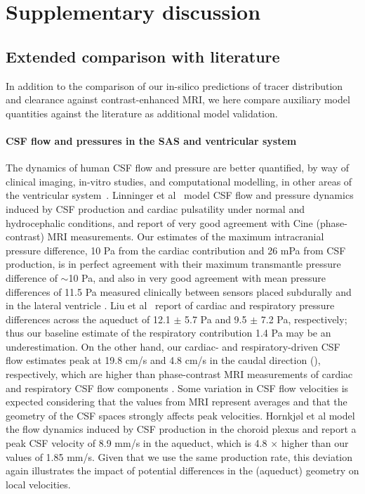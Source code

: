 \documentclass[fleqn,10pt]{wlscirep}
\begin{document}
\section{Supplementary discussion}

\subsection{Extended comparison with literature}
\label{sec:app:model_validation}

In addition to the comparison of our in-silico predictions of tracer
distribution and clearance against contrast-enhanced MRI, we here compare
auxiliary model quantities against the literature as additional model
validation.

\paragraph{CSF flow and pressures in the SAS and ventricular system}
The dynamics of human CSF flow and pressure are better quantified, by
way of clinical imaging, in-vitro studies, and computational
modelling, in other areas of the ventricular
system~\cite{linninger2007cerebrospinal, sweetman2011cerebrospinal,
  vinje2019respiratory, hornkjol2022csf, causemann2022human,
  karki2025real, liu2025transmantle}. Linninger et
al~\cite{linninger2007cerebrospinal} model CSF flow and pressure
dynamics induced by CSF production and cardiac pulsatility under
normal and hydrocephalic conditions, and report of very good agreement
with Cine (phase-contrast) MRI measurements. Our estimates of the
maximum intracranial pressure difference, 10 Pa from the cardiac
contribution and 26 mPa from CSF production, is in perfect agreement
with their maximum transmantle pressure difference of $\sim$10 Pa, and
also in very good agreement with mean pressure differences of 11.5 Pa
measured clinically between sensors placed subdurally and in the
lateral ventricle \cite{vinje2019respiratory}. Liu et
al~\cite{liu2025transmantle} report of cardiac and respiratory
pressure differences across the aqueduct of 12.1 $\pm$ 5.7 Pa and 9.5
$\pm$ 7.2 Pa, respectively; thus our baseline estimate of the respiratory contribution 1.4 Pa may be an
underestimation. On the other hand, our cardiac- and
respiratory-driven CSF flow estimates peak at 19.8 cm/s and 4.8 cm/s in the caudal direction (), respectively, which are higher than phase-contrast MRI measurements of cardiac and respiratory CSF flow
components \cite{takizawa2017characterization, yildiz2017quantifying}. Some variation in CSF flow velocities is expected considering that the values from MRI represent averages
\cite{yildiz2017quantifying} and that the geometry of the CSF spaces
strongly affects peak velocities\cite{vinje2019respiratory,
  causemann2022human}. Hornkjøl et al \cite{hornkjol2022csf} model the
flow dynamics induced by CSF production in the choroid plexus and
report a peak CSF velocity of 8.9 mm/s in the aqueduct, which is 4.8
$\times$ higher than our values of 1.85 mm/s. Given that we use the
same production rate, this deviation again illustrates the impact of
potential differences in the (aqueduct) geometry on local velocities.
\end{document}
